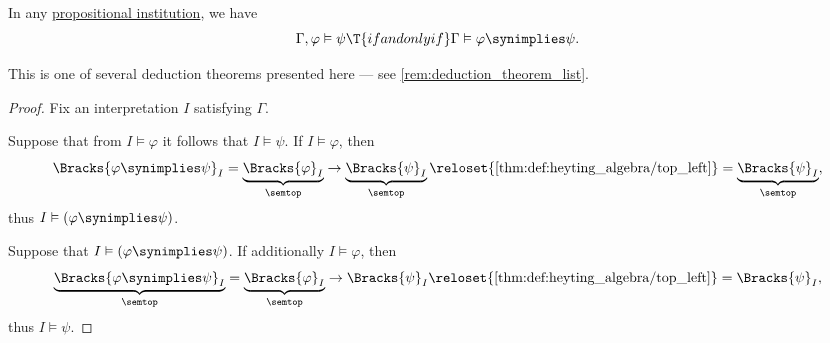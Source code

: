 \begin{theorem}\label{thm:propositional_semantic_deduction_theorem}
  In any \hyperref[def:propositional_institution]{propositional institution}, we have
  \begin{equation*}
    \Gamma, \varphi \vDash \psi \T{if and only if} \Gamma \vDash \varphi \synimplies \psi.
  \end{equation*}
\end{theorem}
\begin{comments}
  \item This is one of several deduction theorems presented here --- see \cref{rem:deduction_theorem_list}.
\end{comments}
\begin{proof}
  Fix an interpretation \( I \) satisfying \( \Gamma \).

  \SufficiencySubProof Suppose that from \( I \vDash \varphi \) it follows that \( I \vDash \psi \). If \( I \vDash \varphi \), then
  \begin{equation*}
    \Bracks{\varphi \synimplies \psi}_I
    =
    \underbrace{\Bracks{\varphi}_I}_{\semtop} \rightarrow \underbrace{\Bracks{\psi}_I}_{\semtop}
    \reloset {\ref{thm:def:heyting_algebra/top_left}} =
    \underbrace{\Bracks{\psi}_I}_{\semtop},
  \end{equation*}
  thus \( I \vDash (\varphi \synimplies \psi) \).

  \NecessitySubProof Suppose that \( I \vDash (\varphi \synimplies \psi) \). If additionally \( I \vDash \varphi \), then
  \begin{equation*}
    \underbrace{\Bracks{\varphi \synimplies \psi}_I}_{\semtop}
    =
    \underbrace{\Bracks{\varphi}_I}_{\semtop} \rightarrow \Bracks{\psi}_I
    \reloset {\ref{thm:def:heyting_algebra/top_left}} =
    \Bracks{\psi}_I,
  \end{equation*}
  thus \( I \vDash \psi \).
\end{proof}

